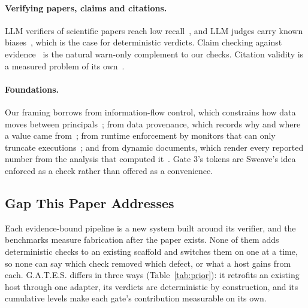 \documentclass[sigconf,anonymous]{aamas}
\newcommand{\gates}{G.A.T.E.S.}
\begin{document}
\paragraph{Verifying papers, claims and citations.}
LLM verifiers of scientific papers reach low recall~\cite{son2025spot}, and LLM judges carry known biases~\cite{zheng2023judge}, which is the case for deterministic verdicts.
Claim checking against evidence~\cite{tang2024minicheck} is the natural warn-only complement to our checks.
Citation validity is a measured problem of its own~\cite{xu2026ghostcite,shi2026citeaudit}.

\paragraph{Foundations.}
Our framing borrows from information-flow control, which constrains how data moves between principals~\cite{denning1976lattice,sabelfeld2003language}; from data provenance, which records why and where a value came from~\cite{buneman2001why}; from runtime enforcement by monitors that can only truncate executions~\cite{schneider2000enforceable}; and from dynamic documents, which render every reported number from the analysis that computed it~\cite{leisch2002sweave}.
Gate 3's tokens are Sweave's idea enforced as a check rather than offered as a convenience.

\subsection{Gap This Paper Addresses}

Each evidence-bound pipeline is a new system built around its verifier, and the benchmarks measure fabrication after the paper exists.
None of them adds deterministic checks to an existing scaffold and switches them on one at a time, so none can say which check removed which defect, or what a host gains from each.
\gates{} differs in three ways (Table~\ref{tab:prior}): it retrofits an existing host through one adapter, its verdicts are deterministic by construction, and its cumulative levels make each gate's contribution measurable on its own.
\end{document}
